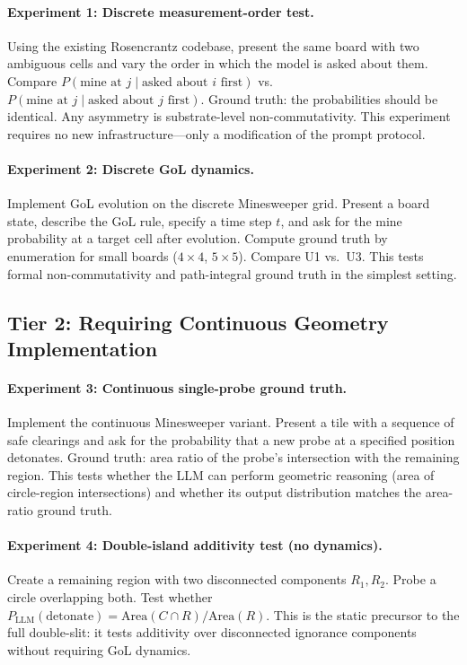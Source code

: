 \documentclass[12pt,a4paper]{article}
\theoremstyle{definition}
\theoremstyle{remark}
\newcommand{\Area}{\mathrm{Area}}
\begin{document}
\paragraph{Experiment 1: Discrete measurement-order test.}
Using the existing Rosencrantz codebase, present the same board with two ambiguous cells and vary the order in which the model is asked about them.  Compare $P(\text{mine at } j \mid \text{asked about } i \text{ first})$ vs.\ $P(\text{mine at } j \mid \text{asked about } j \text{ first})$.  Ground truth: the probabilities should be identical.  Any asymmetry is substrate-level non-commutativity.  This experiment requires no new infrastructure---only a modification of the prompt protocol.

\paragraph{Experiment 2: Discrete GoL dynamics.}
Implement GoL evolution on the discrete Minesweeper grid.  Present a board state, describe the GoL rule, specify a time step $t$, and ask for the mine probability at a target cell after evolution.  Compute ground truth by enumeration for small boards ($4 \times 4$, $5 \times 5$).  Compare U1 vs.\ U3.  This tests formal non-commutativity and path-integral ground truth in the simplest setting.

\subsection{Tier 2: Requiring Continuous Geometry Implementation}

\paragraph{Experiment 3: Continuous single-probe ground truth.}
Implement the continuous Minesweeper variant.  Present a tile with a sequence of safe clearings and ask for the probability that a new probe at a specified position detonates.  Ground truth: area ratio of the probe's intersection with the remaining region.  This tests whether the LLM can perform geometric reasoning (area of circle-region intersections) and whether its output distribution matches the area-ratio ground truth.

\paragraph{Experiment 4: Double-island additivity test (no dynamics).}
Create a remaining region with two disconnected components $R_1, R_2$.  Probe a circle overlapping both.  Test whether $P_{\text{LLM}}(\text{detonate}) = \Area(C \cap R) / \Area(R)$.  This is the static precursor to the full double-slit: it tests additivity over disconnected ignorance components without requiring GoL dynamics.
\end{document}
